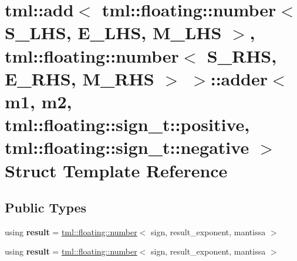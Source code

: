 \hypertarget{structtml_1_1add_3_01tml_1_1floating_1_1number_3_01S__LHS_00_01E__LHS_00_01M__LHS_01_4_00_01tml_ae8c40fd43e7d15c5a5dcc83d2ae89a7}{\section{tml\+:\+:add$<$ tml\+:\+:floating\+:\+:number$<$ S\+\_\+\+L\+H\+S, E\+\_\+\+L\+H\+S, M\+\_\+\+L\+H\+S $>$, tml\+:\+:floating\+:\+:number$<$ S\+\_\+\+R\+H\+S, E\+\_\+\+R\+H\+S, M\+\_\+\+R\+H\+S $>$ $>$\+:\+:adder$<$ m1, m2, tml\+:\+:floating\+:\+:sign\+\_\+t\+:\+:positive, tml\+:\+:floating\+:\+:sign\+\_\+t\+:\+:negative $>$ Struct Template Reference}
\label{structtml_1_1add_3_01tml_1_1floating_1_1number_3_01S__LHS_00_01E__LHS_00_01M__LHS_01_4_00_01tml_ae8c40fd43e7d15c5a5dcc83d2ae89a7}
}
\subsection*{Public Types}
\begin{DoxyCompactItemize}
\item 
\hypertarget{structtml_1_1add_3_01tml_1_1floating_1_1number_3_01S__LHS_00_01E__LHS_00_01M__LHS_01_4_00_01tml_ae8c40fd43e7d15c5a5dcc83d2ae89a7_adf3b88a14c1ba1ad64271b1e45f67504}{using {\bfseries result} = \hyperlink{structtml_1_1floating_1_1number}{tml\+::floating\+::number}$<$ sign, result\+\_\+exponent, mantissa $>$}\label{structtml_1_1add_3_01tml_1_1floating_1_1number_3_01S__LHS_00_01E__LHS_00_01M__LHS_01_4_00_01tml_ae8c40fd43e7d15c5a5dcc83d2ae89a7_adf3b88a14c1ba1ad64271b1e45f67504}

\item 
\hypertarget{structtml_1_1add_3_01tml_1_1floating_1_1number_3_01S__LHS_00_01E__LHS_00_01M__LHS_01_4_00_01tml_ae8c40fd43e7d15c5a5dcc83d2ae89a7_adf3b88a14c1ba1ad64271b1e45f67504}{using {\bfseries result} = \hyperlink{structtml_1_1floating_1_1number}{tml\+::floating\+::number}$<$ sign, result\+\_\+exponent, mantissa $>$}\label{structtml_1_1add_3_01tml_1_1floating_1_1number_3_01S__LHS_00_01E__LHS_00_01M__LHS_01_4_00_01tml_ae8c40fd43e7d15c5a5dcc83d2ae89a7_adf3b88a14c1ba1ad64271b1e45f67504}

\end{DoxyCompactItemize}
